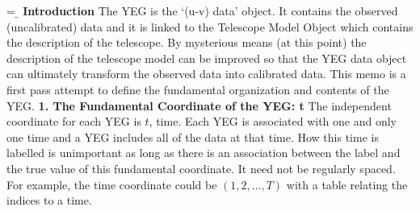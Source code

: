 \def\SSSIX   {in Stars and Stellar Systems, Vol. IX,
             Galaxies and the Universe,
             ed. A. Sandage, M. Sandage, \& J. Kristian 
             (University of Chicago Press), }
\def\APFORM  {in Astrophysical Formulae, Second Edition, 
             (New York: Springer Verlag), } %
\def\APGNAGN {in Astrophysics of Gaseous Nebulae and Active Galactic Nuclei,
             (Mill Valley CA: University Science Books), }%
\def\QSRAST  {in Quasar Astronomy, 
             (New York: Cambridge University Press), } %
%
    \hoffset=-0.1in\voffset=-0.2in\hsize=6.5in\vsize=9.0in\columns\ksmrm
\baselineskip=12pt %
%


\magnification=\magstephalf
{}
\b
{}
\s
{}
\bn
{\bf Introduction}
\s
The YEG is the `(u-v) data' object.  It contains the observed (uncalibrated)
data and it is linked to the Telescope Model Object which contains the
description of the telescope.  By mysterious means (at this point) the
description of the telescope model can be improved so that the YEG
data object can ultimately transform the observed data into
calibrated data.  This memo is a first pass attempt to define the
fundamental organization and contents of the YEG.
\bn
{\bf 1. The Fundamental Coordinate of the YEG: t}
\m
The independent coordinate for each YEG is $t$, time.  Each YEG
is associated with one and only one time and a YEG includes all of the
data at that time.  How this time is labelled is unimportant as long
as there is an association between the label and the true value of
this fundamental coordinate.  It need not be regularly spaced.  For
example, the time coordinate could be $(1,2,\ldots,T)$ with a table
relating the indices to a time.

